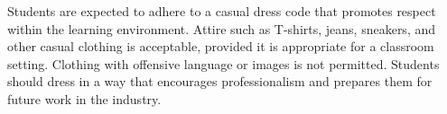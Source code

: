 Students are expected to adhere to a casual dress code that promotes respect within the learning environment.
Attire such as T-shirts, jeans, sneakers, and other casual clothing is acceptable, provided it is appropriate
for a classroom setting. Clothing with offensive language or images is not permitted. Students should dress
in a way that encourages professionalism and prepares them for future work in the industry.

